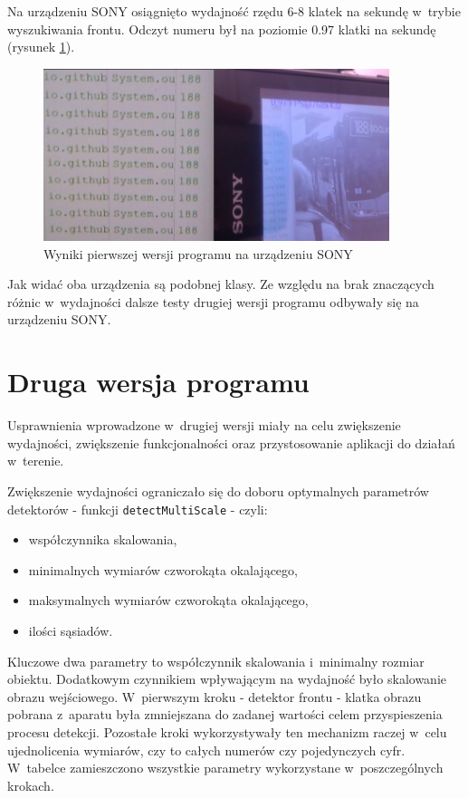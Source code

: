 Na urządzeniu SONY osiągnięto wydajność rzędu 6-8 klatek na sekundę
w~trybie wyszukiwania frontu. Odczyt numeru był na poziomie 0.97
klatki na sekundę (rysunek \ref{fig:imp_sony_v1}).

\begin{figure}[h!]
    \centering
    \includegraphics[width=0.9\textwidth]{img/imp_sony_v1}
    \caption{Wyniki pierwszej wersji programu na urządzeniu SONY}
    \label{fig:imp_sony_v1}
\end{figure}

Jak widać oba urządzenia są podobnej klasy. Ze względu na brak
znaczących różnic w~wydajności dalsze testy drugiej wersji 
programu odbywały się na urządzeniu SONY.

\section{Druga wersja programu}

Usprawnienia wprowadzone w~drugiej wersji miały na celu zwiększenie
wydajności, zwiększenie funkcjonalności oraz przystosowanie 
aplikacji do działań w~terenie.

Zwiększenie wydajności ograniczało się do doboru optymalnych parametrów
detektorów - funkcji \verb|detectMultiScale| - czyli:

\begin{itemize}
    \item współczynnika skalowania,
    \item minimalnych wymiarów czworokąta okalającego,
    \item maksymalnych wymiarów czworokąta okalającego,
    \item ilości sąsiadów.
\end{itemize}

Kluczowe dwa parametry to współczynnik skalowania i~minimalny rozmiar
obiektu. Dodatkowym czynnikiem wpływającym na wydajność było
skalowanie obrazu wejściowego. W~pierwszym kroku - detektor frontu -
klatka obrazu pobrana z~aparatu była zmniejszana do zadanej wartości
celem przyspieszenia procesu detekcji. Pozostałe kroki wykorzystywały
ten mechanizm raczej w~celu ujednolicenia wymiarów, czy to całych 
numerów czy pojedynczych cyfr. W~tabelce zamieszczono wszystkie 
parametry wykorzystane w~poszczególnych krokach.

